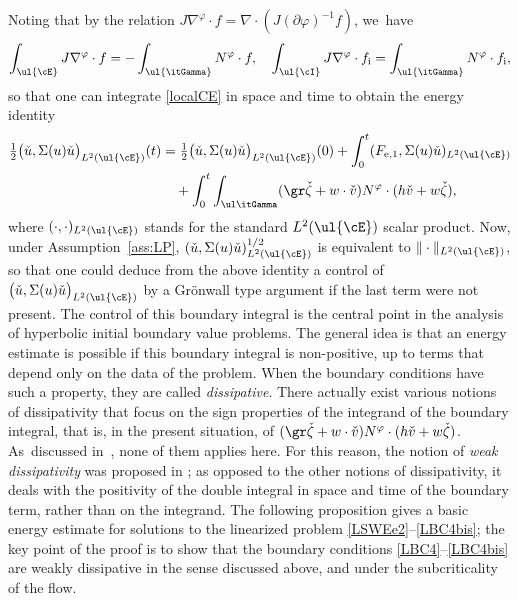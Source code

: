 Noting that by the relation $J\nabla^\varphi\cdot f=\nabla\cdot(J(\partial\varphi)^{-1}f)$, we~have
\begin{equation}\label{DivTh}
\int_{\ul{\cE}}J\nabla^\varphi\cdot f = -\int_{\ul{\itGamma}}N^\varphi\cdot f, \quad
\int_{\ul{\cI}}J\nabla^\varphi\cdot f_\mathrm{i} = \int_{\ul{\itGamma}}N^\varphi\cdot f_\mathrm{i},
\end{equation}
so that one can integrate \eqref{localCE} in space and time to obtain the energy identity
\begin{align}\label{weakdissip0}
\tfrac{1}{2} \big(\check{u},\Sigma(u)\check{u}\big)_{L^2(\ul{\cE})}(t)
&= \tfrac{1}{2} \big(\check{u},\Sigma(u)\check{u}\big)_{L^2(\ul{\cE})}(0)
+ \int_0^t (F_{{\rm e},1},\Sigma(u)\check{u})_{L^2(\ul{\cE})} \\
&\quad
+ \int_0^t \int_{\ul\itGamma} (\gr\check{\zeta}+w\cdot\check{v}) N^\varphi\cdot (h\check{v}+w\check{\zeta}), \nonumber
\end{align}
where $(\cdot,\cdot)_{L^2(\ul{\cE})}$ stands for the standard $L^2(\ul{\cE})$ scalar product.
Now, under Assumption~\ref{ass:LP}, $(\check{u},\Sigma(u)\check{u})_{L^2(\ul{\cE})}^{1/2}$ is equivalent to $\Vert \cdot \Vert_{L^2(\ul{\cE})}$,
so that one could deduce from the above identity a control of $\big(\check{u},\Sigma(u)\check{u}\big)_{L^2(\ul{\cE})}$ by a Grönwall type argument
if the last term were not present.
The control of this boundary integral is the central point in the analysis of hyperbolic initial boundary value problems.
The general idea is that an energy estimate is possible if this boundary integral is non-positive, up to terms that depend only on the data of the problem.
When the boundary conditions have such a property, they are called {\it dissipative}.
There actually exist various notions of dissipativity that focus on the sign properties of the integrand of the boundary integral, that is,
in the present situation, of $(\gr\check{\zeta}+w\cdot\check{v}) N^\varphi\cdot (h\check{v}+w\check{\zeta})$. As~discussed in~\cite{IguchiLannes2023}, none of them applies here.
For this reason, the notion of {\it weak dissipativity} was proposed in \cite{IguchiLannes2023}; as opposed to the other notions of dissipativity,
it deals with the positivity of the double integral in space and time of the boundary term, rather than on the integrand.
The following proposition gives a basic energy estimate for solutions to the linearized problem \eqref{LSWEe2}--\eqref{LBC4bis};
the key point of the proof is to show that the boundary conditions \eqref{LBC4}--\eqref{LBC4bis} are weakly dissipative in the sense discussed above,
and under the subcriticality of the flow.

